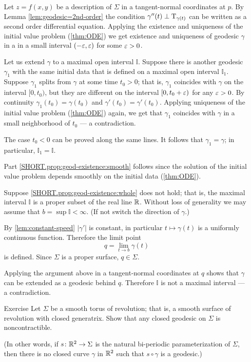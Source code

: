 Let $z=f(x,y)$ be a description of $\Sigma$ in a tangent-normal coordinates at $p$.
By Lemma \ref{lem:geodesic=2nd-order} the condition $\gamma''(t)\perp\mathrm{T}_{\gamma(t)}$ can be written as a second order differential equation.
Applying the existence and uniqueness of the initial value problem (\ref{thm:ODE}) we get existence and uniqueness of geodesic $\gamma$ in a in a small interval $(-\varepsilon,\varepsilon)$ for some $\varepsilon>0$.

Let us extend $\gamma$ to a maximal open interval $\mathbb{I}$.
Suppose there is another geodesic $\gamma_1$ with the same initial data that is defined on a maximal open interval $\mathbb{I}_1$.
Suppose $\gamma_1$ splits from $\gamma$ at some time $t_0>0$;
that is, $\gamma_1$ coincides with $\gamma$ on the interval $[0,t_0)$, but they are different on the interval $[0,t_0+\varepsilon)$ for any $\varepsilon>0$.
By continuity $\gamma_1(t_0)=\gamma(t_0)$ and $\gamma'(t_0)=\gamma'(t_0)$.
Applying uniqueness of the initial value problem (\ref{thm:ODE}) again, we get that $\gamma_1$ coincides with $\gamma$ in a small neighborhood of $t_0$ --- a contradiction.

The case $t_0<0$ can be proved along the same lines.
It follows that $\gamma_1=\gamma$;
in particular, $\mathbb{I}_1=\mathbb{I}$.

Part \ref{SHORT.prop:geod-existence:smooth} follows since the solution of the initial value problem depends smoothly on the initial data (\ref{thm:ODE}).

Suppose \ref{SHORT.prop:geod-existence:whole} does not hold;
that is, the maximal interval $\mathbb{I}$ is a proper subset of the real line $\mathbb{R}$.
Without loss of generality we may assume that $b=\sup\mathbb{I}<\infty$.
(If not switch the direction of $\gamma$.)

By \ref{lem:constant-speed} $|\gamma'|$ is constant, in particular $t\mapsto \gamma(t)$ is a uniformly continuous function.
Therefore  the limit point
\[q=\lim_{t\to b}\gamma(t)\] 
is defined.
Since $\Sigma$ is a proper surface, $q\in \Sigma$. 

Applying the argument above in a tangent-normal coordinates at $q$ shows that $\gamma$ can be extended as a geodesic behind $q$.
Therefore $\mathbb{I}$ is not a maximal interval --- a contradiction.
\qeds

\begin{thm}{Exercise}\label{ex:round-torus}
Let $\Sigma$ be a smooth torus of revolution; that is,
a smooth surface of revolution with closed generatrix.
Show that any closed geodesic on $\Sigma$ is noncontractible.

(In other words, if $s\colon\mathbb{R}^2\to \Sigma$ is the natural bi-periodic parameterization of $\Sigma$, then
there is no closed curve $\gamma$ in $\mathbb{R}^2$ such that $s\circ\gamma$ is a geodesic.)
\end{thm}


